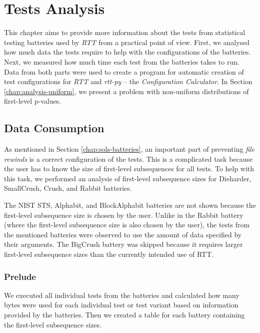 \documentclass[
  digital,     %
  oneside,     %
  nosansbold,  %
  nocolorbold, %
  nolof,         %
  nolot,         %
]{fithesis4}
\begin{document}

\chapter{Tests Analysis} \label{chap: analysis}
This chapter aims to provide more information about the tests from statistical testing batteries used by \emph{RTT} from a practical point of view. First, we analysed how much data the tests require to help with the configurations of the batteries. Next, we measured how much time each test from the batteries takes to run. Data from both parts were used to create a program for automatic creation of test configurations for \emph{RTT} and \emph{rtt-py} -- the \emph{Configuration Calculator}. In Section \ref{chap:analysis-uniform}, we present a problem with non-uniform distributions of first-level p-values.




\section{Data Consumption} \label{chap:analysis-data}

As mentioned in Section \ref{chap:sols-batteries}, an important part of preventing \emph{file rewinds} is a correct configuration of the tests. This is a complicated task because the user has to know the size of first-level subsequences for all tests. To help with this task, we performed an analysis of first-level subsequence sizes for Dieharder, SmallCrush, Crush, and Rabbit batteries.  

The NIST STS, Alphabit, and BlockAlphabit batteries are not shown because the first-level subsequence size is chosen by the user. Unlike in the Rabbit battery (where the first-level subsequence size is also chosen by the user), the tests from the mentioned batteries were observed to use the amount of data specified by their arguments. The BigCrush battery was skipped because it requires larger first-level subsequence sizes than the currently intended use of RTT.


\subsection{Prelude} \label{chap:analysis-data-intro}
We executed all individual tests from the batteries and calculated how many bytes were used for each individual test or test variant based on information provided by the batteries. Then we created a table for each battery containing the first-level subsequence sizes.
\end{document}
